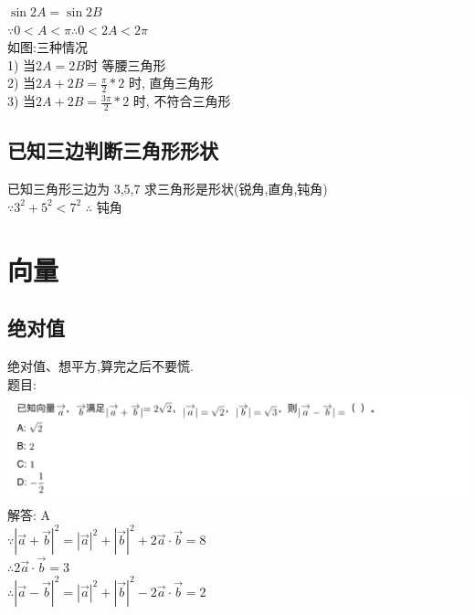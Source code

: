 \documentclass[hyperref, UTF8,11pt,a4paper]{ctexart} %
\begin{document}
{\color{red} $ \sin 2A= \sin 2B$ } \\

$\because 0<A<\pi \therefore 0<2A<2\pi$ \\
如图:三种情况 \\
1) 当$ 2A=2B $时 等腰三角形 \\
2) 当$ 2A+2B= \frac{\pi}{2} * 2 $ 时, 直角三角形 \\
3) 当$ 2A+2B= \frac{3\pi}{2} * 2 $ 时, 不符合三角形 \\




\subsection{已知三边判断三角形形状}
{\color{red} 已知三角形三边为 3,5,7 求三角形是形状(锐角,直角,钝角) } \\
$\because 3^{2}+5^{2}<7^{2}$ $\therefore$ 钝角

\section{向量}


\subsection{绝对值}
{\color{blue} 绝对值、想平方,算完之后不要慌. }\\
{\color{red}  题目: } \\
\includegraphics[width=500pt]  {pic/xiangliang/jueduizhi.jpg} \\
解答: A\\
$\because |\vec{a}+\vec{b}|^{2}=|\vec{a}|^{2}+|\vec{b}|^{2}+2 \vec{a} \cdot \vec{b}=8$ \\
$ \therefore 2 \vec{a} \cdot \vec{b}=3$ \\
$\therefore |\vec{a}-\vec{b}|^{2}=|\vec{a}|^{2}+|\vec{b}|^{2}-2 \vec{a} \cdot \vec{b}=2$ \\
\end{document}
